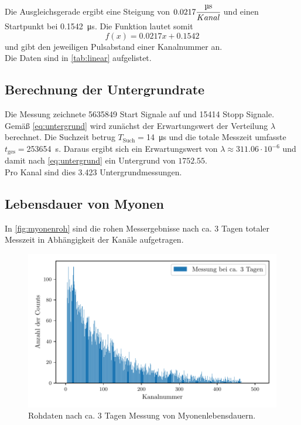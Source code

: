 Die Ausgleichsgerade ergibt eine Steigung von $0.0217\cfrac{\si{\micro\second}}{Kanal}$ und einen Startpunkt bei \SI{0.1542}{\micro\second}.
Die Funktion lautet somit
\begin{equation}
    f(x) = 0.0217x + 0.1542
\end{equation}
und gibt den jeweiligen Pulsabstand einer Kanalnummer an.\\
Die Daten sind in \autoref{tab:linear} aufgelistet.

\subsection{Berechnung der Untergrundrate}
Die Messung zeichnete 5635849 Start Signale auf und 15414 Stopp Signale.\\
Gemäß \autoref{eq:untergrund} wird zunächst der Erwartungswert der Verteilung $\lambda$ berechnet.
Die Suchzeit betrug $T_{\text{Such}} = $\SI{14}{\micro\second} und die totale Messzeit umfasste $t_{\text{ges}} = $\SI{253654}{\second}.
Daraus ergibt sich ein Erwartungswert von $\lambda \approx 311.06\cdot 10^{-6}$ und damit nach \autoref{eq:untergrund} ein Untergrund von $1752.55$.\\
Pro Kanal sind dies 3.423 Untergrundmessungen.

\subsection{Lebensdauer von Myonen}
In \autoref{fig:myonenroh} sind die rohen Messergebnisse nach ca. 3 Tagen totaler Messzeit in Abhängigkeit der Kanäle aufgetragen.

\begin{figure}[H]
    \centering
    \includegraphics{images/messung_roh.pdf}
    \caption{Rohdaten nach ca. 3 Tagen Messung von Myonenlebensdauern.}
    \label{fig:myonenroh}
\end{figure}

